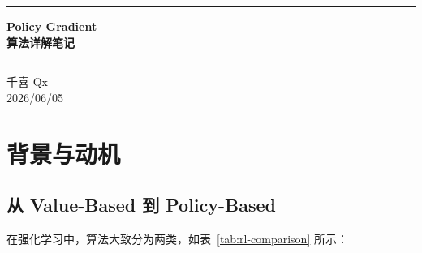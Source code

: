 \documentclass[12pt,a4paper]{article}
\theoremstyle{noteplain}
\theoremstyle{noteexercise}
\begin{document}
\thispagestyle{empty}

\vspace*{1cm}

\begin{center}
  \parbox{0.9\textwidth}{
    \centering
    \rule[6pt]{0.9\textwidth}{2pt}
    \vspace{0.3cm}
    {\LARGE\bfseries\color{deepblue} Policy Gradient \\[0.4em] 算法详解笔记}
    \vspace{0.3cm}
    \rule[6pt]{0.9\textwidth}{2pt}
  }
\end{center}

\vspace{0.8cm}

\begin{center}
  \begin{minipage}{0.7\textwidth}
    \centering
    \large\rmfamily\color{authorred} 
    千喜 Qx \\[0.6em]
    
    \normalsize\rmfamily\color{darkgray} 2026/06/05
  \end{minipage}
\end{center}

\vspace{1cm}

\tableofcontents

\newpage
{}
\pagestyle{fancy}

\section{背景与动机}\label{sec:bg}

\subsection{从 Value-Based 到 Policy-Based}\label{ssec:value-vs-policy}

在强化学习中，算法大致分为两类，如表~\ref{tab:rl-comparison} 所示：
\end{document}
